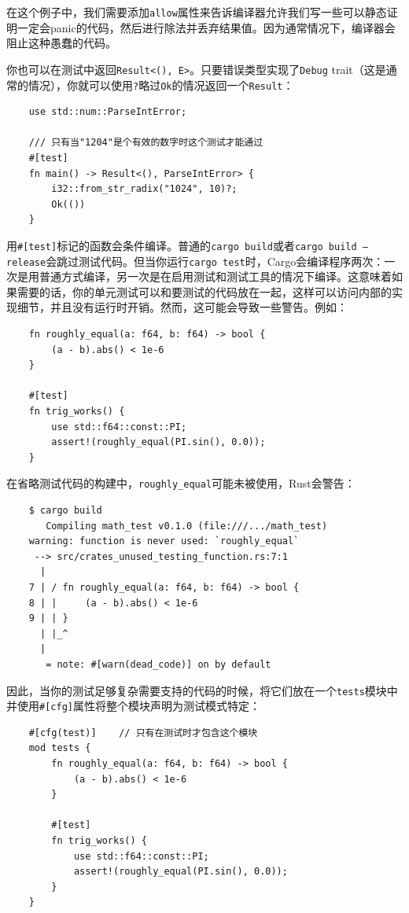 在这个例子中，我们需要添加\texttt{allow}属性来告诉编译器允许我们写一些可以静态证明一定会panic的代码，然后进行除法并丢弃结果值。因为通常情况下，编译器会阻止这种愚蠢的代码。

你也可以在测试中返回\texttt{Result<(), E>}。只要错误类型实现了\texttt{Debug} trait（这是通常的情况），你就可以使用\texttt{?}略过\texttt{Ok}的情况返回一个\texttt{Result}：
\begin{verbatim}
    use std::num::ParseIntError;

    /// 只有当"1204"是个有效的数字时这个测试才能通过
    #[test]
    fn main() -> Result<(), ParseIntError> {
        i32::from_str_radix("1024", 10)?;
        Ok(())
    }
\end{verbatim}

用\texttt{\#[test]}标记的函数会条件编译。普通的\texttt{cargo build}或者\texttt{cargo build --release}会跳过测试代码。但当你运行\texttt{cargo test}时，Cargo会编译程序两次：一次是用普通方式编译，另一次是在启用测试和测试工具的情况下编译。这意味着如果需要的话，你的单元测试可以和要测试的代码放在一起，这样可以访问内部的实现细节，并且没有运行时开销。然而，这可能会导致一些警告。例如：
\begin{verbatim}
    fn roughly_equal(a: f64, b: f64) -> bool {
        (a - b).abs() < 1e-6
    }

    #[test]
    fn trig_works() {
        use std::f64::const::PI;
        assert!(roughly_equal(PI.sin(), 0.0));
    }
\end{verbatim}

在省略测试代码的构建中，\texttt{roughly\_equal}可能未被使用，Rust会警告：
\begin{verbatim}
    $ cargo build
       Compiling math_test v0.1.0 (file:///.../math_test)
    warning: function is never used: `roughly_equal`
     --> src/crates_unused_testing_function.rs:7:1
      |
    7 | / fn roughly_equal(a: f64, b: f64) -> bool {
    8 | |     (a - b).abs() < 1e-6    
    9 | | }
      | |_^
      |
       = note: #[warn(dead_code)] on by default
\end{verbatim}

因此，当你的测试足够复杂需要支持的代码的时候，将它们放在一个\texttt{tests}模块中并使用\texttt{\#[cfg]}属性将整个模块声明为测试模式特定：
\begin{verbatim}
    #[cfg(test)]    // 只有在测试时才包含这个模块
    mod tests {
        fn roughly_equal(a: f64, b: f64) -> bool {
            (a - b).abs() < 1e-6
        }

        #[test]
        fn trig_works() {
            use std::f64::const::PI;
            assert!(roughly_equal(PI.sin(), 0.0));
        }
    }
\end{verbatim}

